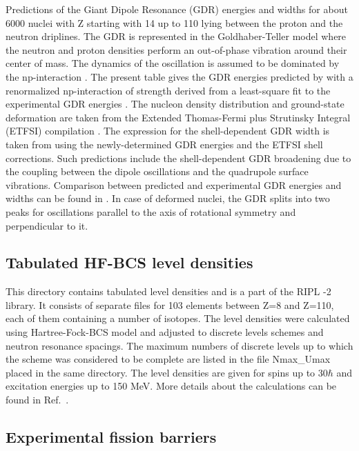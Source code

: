 Predictions of the Giant Dipole Resonance (GDR) energies and widths for
about 6000 nuclei with Z starting with 14 up to 110 lying between the proton
and the neutron driplines. The GDR is represented in the Goldhaber-Teller
model \cite{Goldhaber48} where the neutron and proton densities perform an
out-of-phase vibration around their center of mass. The dynamics of the
oscillation is assumed to be dominated by the np-interaction \cite{Isacker92}%
. The present table gives the GDR energies predicted by \cite{Isacker92}
with a renormalized np-interaction of strength derived from a least-square
fit to the experimental GDR energies \cite{Goriely98}. The nucleon density
distribution and ground-state deformation are taken from the Extended
Thomas-Fermi plus Strutinsky Integral (ETFSI) compilation \cite%
{Goriely2000,Aboussir95}. The expression for the shell-dependent GDR width
is taken from \cite{Thielemann1983} using the newly-determined GDR energies
and the ETFSI shell corrections. Such predictions include the
shell-dependent GDR broadening due to the coupling between the dipole
oscillations and the quadrupole surface vibrations. Comparison between
predicted and experimental GDR energies and widths can be found in \cite%
{Goriely98}. In case of deformed nuclei, the GDR splits into two peaks for
oscillations parallel to the axis of rotational symmetry and perpendicular
to it.

\subsection{Tabulated HF-BCS level densities}

This directory contains tabulated level densities%
 and is a part of the RIPL%
-2 library. It consists of separate files for 103 elements
between Z=8 and Z=110, each of them containing a number of isotopes. The
level densities were calculated using Hartree-Fock-BCS model and adjusted to
discrete levels schemes and neutron resonance spacings. The maximum numbers
of discrete levels up to which the scheme was considered to be complete are
listed in the file Nmax\_Umax placed in the same directory. The level
densities are given for spins up to 30$\hbar$ and excitation energies up to
150 MeV. More details about the calculations can be found in Ref.~\cite%
{HFBCS}.

\subsection{Experimental fission barriers}

